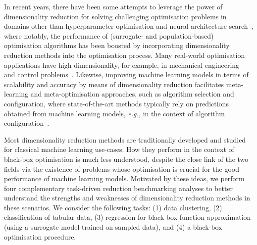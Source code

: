 In recent years, there have been some attempts to leverage the power of dimensionality reduction for solving challenging optimisation problems in domains other than hyperparameter optimisation and neural architecture search~\citep{RapEtAl20, AntEtAl22, MeiWan21b, WanEtAl16b, KapEtAl16, AbbEtAl20}, where notably, the performance of (surrogate- and population-based) optimisation algorithms has been boosted by incorporating dimensionality reduction methods into the optimisation process.
Many real-world optimisation applications have high dimensionality, for example, in mechanical engineering~\citep{Jones08} and control problems~\citep{ZuoEtAl24}.
Likewise, improving machine learning models in terms of scalability and accuracy by means of dimensionality reduction facilitates meta-learning and meta-optimisation approaches, such as algorithm selection and configuration, where state-of-the-art methods typically rely on predictions obtained from machine learning models, \emph{e.g.,} in the context of algorithm configuration~\citep{HutEtAl11}.

Most dimensionality reduction methods are traditionally developed and studied for classical machine learning use-cases.
How they perform in the context of  black-box optimisation is much less understood, despite the close link of the two fields via the existence of problems whose optimisation is crucial for the good performance of machine learning models.
Motivated by these ideas, we perform four complementary task-driven reduction benchmarking analyses
to better understand the strengths and weaknesses of dimensionality reduction methods in these scenarios.
We consider the following tasks:
(1) data clustering,
(2) classification of tabular data,
(3) regression for black-box function approximation (using a surrogate model trained on sampled data),
and (4) a black-box optimisation procedure.

